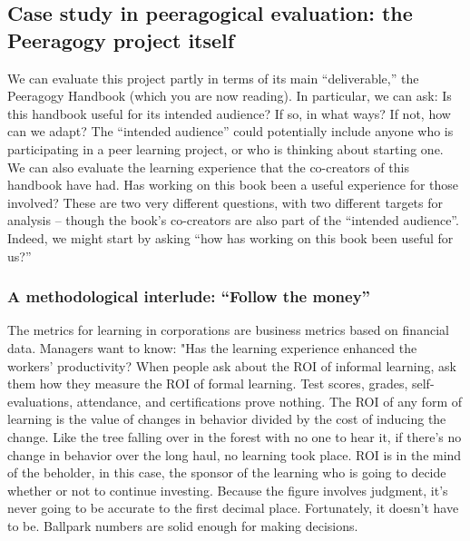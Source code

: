 \subsection{Case study in peeragogical evaluation: the Peeragogy project
itself}

We can evaluate this project partly in terms of its main
``deliverable,'' the Peeragogy Handbook (which you are now reading). In
particular, we can ask: Is this handbook useful for its intended
audience? If so, in what ways? If not, how can we adapt? The ``intended
audience'' could potentially include anyone who is participating in a
peer learning project, or who is thinking about starting one. We can
also evaluate the learning experience that the co-creators of this
handbook have had. Has working on this book been a useful experience for
those involved? These are two very different questions, with two
different targets for analysis -- though the book's co-creators are also
part of the ``intended audience''. Indeed, we might start by asking
``how has working on this book been useful for us?''

\subsubsection{A methodological interlude: ``Follow the money''}

The metrics for learning in corporations are business metrics based on
financial data. Managers want to know: "Has the learning experience
enhanced the workers' productivity? When people ask about the ROI of
informal learning, ask them how they measure the ROI of formal learning.
Test scores, grades, self-evaluations, attendance, and certifications
prove nothing. The ROI of any form of learning is the value of changes
in behavior divided by the cost of inducing the change. Like the tree
falling over in the forest with no one to hear it, if there's no change
in behavior over the long haul, no learning took place. ROI is in the
mind of the beholder, in this case, the sponsor of the learning who is
going to decide whether or not to continue investing. Because the figure
involves judgment, it's never going to be accurate to the first decimal
place. Fortunately, it doesn't have to be. Ballpark numbers are solid
enough for making decisions.

